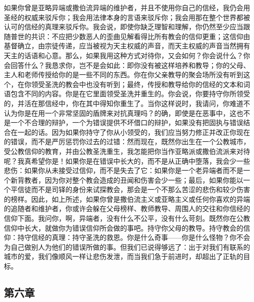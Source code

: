 如果你曾是亚略异端或撒伯流异端的维护者，并且不使用你自己的信经，我仍会用圣经的权威来驳斥你；我会用法律本身的言语来驳斥你；我会用那在整个世界都被认可的信经的真理来驳斥你。我会说，即使你缺乏理智和理解，你仍然至少应当跟随普世的共识：不应把少数恶人的歪曲见解看得比所有教会的信仰更重；这信仰由基督确立，由宗徒传递，应当被视为天主权威的声音，而天主权威的声音当然拥有天主的话语和心意。那么，如果我用这种方式对待你，又会如何？你会说什么？你会回答什么？我恳求你，岂不是会如此：即你没有被这样培养和教导；你的父母、主人和老师传授给你的是一些不同的东西。你在你父亲教导的聚会场所没有听到这个，在你领受圣洗的教会中也没有听到；最终，传授和教导给你的信经的文本和词语包含不同的内容。你是在它里面领受圣洗并重生的。你会说，你要持守你所领受的，并活在那信经中，你在其中得知你重生了。当你这样说时，我请问，你难道不认为你是在用一个非常坚固的盾牌来对抗真理吗？的确，即使是在恶事中，这也不是一个不合理的辩护，一个为错误提供不坏借口的辩护，如果没有把固执与错误结合在一起的话。因为如果你持守了你从小领受的，我们应当努力修正并改正你现在的错误，而不是严厉惩罚你过去的过错：然而现在，既然你出生在一个公教城市，受公教信仰的教育，并由公教圣洗重生，我怎能把你当作亚略派或撒伯流派来对待呢？我真希望你是！如果你是在错误中长大的，而不是从正确中堕落，我会少一些悲伤：如果你从未接受过信仰，而不是失去了它：如果你是一个老异端者而不是一个新背教者，因为你对整个教会造成的丑闻和伤害会少一些；最后，如果你能以一个平信徒而不是司铎的身份来试探教会，那会是一个不那么苦涩的悲伤和较少伤害的榜样。因此，如上所述，如果你曾是撒伯流主义或亚略主义或任何你喜欢的异端的追随者和维护者，你或许会躲在父母榜样、教师教导、周围人的交往和你信经的信仰下面。我问你，啊，异端者，没有什么不公平，没有什么苛刻。既然你在公教信仰中长大，就做你为错误信仰所会做的事吧。持守你父母的教导。持守教会的信仰：持守信经的真理：持守圣洗的救恩。你是什么奇事——你是什么怪物？你不会为自己做别人为他们的错误所做的事。但我们已说得够远了：出于对我们有联系的城市的爱，我们像顺风一样让悲伤发泄，而当我们急于前进时，却超出了正轨的目标。\par


\subsection{第六章}

\par

